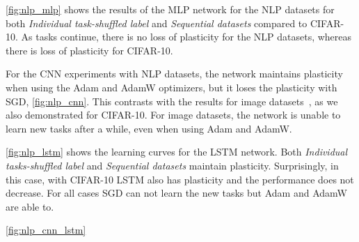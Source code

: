 \autoref{fig:nlp_mlp} shows the results of the MLP network for the NLP datasets for both \textit{Individual task-shuffled label} and \textit{Sequential datasets} compared to CIFAR-10. As tasks continue, there is no loss of plasticity for the NLP datasets, whereas there is loss of plasticity for CIFAR-10.


For the CNN experiments with NLP datasets, the network maintains plasticity when using the Adam and AdamW optimizers, but it loses the plasticity with SGD, \autoref{fig:nlp_cnn}. This contrasts with the results for image datasets~\cite{plasticity papers}, as we also demonstrated for CIFAR-10. For image datasets, the network is unable to learn new tasks after a while, even when using Adam and AdamW.

\autoref{fig:nlp_lstm} shows the learning curves for the LSTM network. Both \textit{Individual tasks-shuffled label} and \textit{Sequential datasets} maintain plasticity. Surprisingly, in this case, with CIFAR-10 LSTM also has plasticity and the performance does not decrease. For all cases SGD can not learn the new tasks but Adam and AdamW are able to. 

\autoref{fig:nlp_cnn_lstm}









